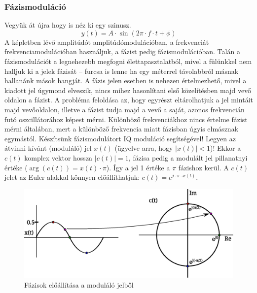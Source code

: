 \documentclass[12pt,a4paper]{article}
\begin{document}
\subsubsection{Fázismoduláció}

Vegyük át újra hogy is néz ki egy szinusz.
\begin{equation}
y(t) = A \cdot \sin{ ( 2\pi \cdot f \cdot t + \phi ) }
\end{equation}
A képletben lévő amplitúdót amplitúdómodulációban, a frekvenciát frekvenciamodulációban használjuk, a fázist pedig fázismodulációban. Talán a fázismodulációt a legnehezebb megfogni élettapasztalatból, mivel a fülünkkel nem halljuk ki a jelek fázisát -- furcsa is lenne ha egy méterrel távolabbról másnak hallanánk mások hangját. A fázis jelen esetben is nehezen értelmezhető, mivel a kiadott jel úgymond elveszik, nincs mihez hasonlítani első közelítésben majd vevő oldalon a fázist. A probléma feloldása az, hogy egyrészt eltárolhatjuk a jel mintáit majd vevőoldalon, illetve a fázist tudja majd a vevő a saját, azonos frekvencián futó oszcillátorához képest mérni. Különböző frekvenciákhoz nincs értelme fázist mérni általában, mert a különböző frekvencia miatt fázisban úgyis elmásznak egymástól.
\clearpage
Készítsünk fázismodulátort IQ moduláció segítségével! Legyen az átvinni kívánt (moduláló) jel $x(t)$ (ügyelve arra, hogy $\vert x(t) \vert<1$)! Ekkor a $c(t)$ komplex vektor hossza $\vert c(t) \vert = 1$, fázisa pedig a modulált jel pillanatnyi értéke ($\arg\left(c(t)\right)=x(t) \cdot \pi$). Így a jel 1 értéke a $\pi$ fázishoz kerül. A $c(t)$ jelet az Euler alakkal könnyen előállíthatjuk: $c(t)=e^{j \cdot \pi \cdot x(t)}$.

\begin{figure}[H]
\begin{center}
\includegraphics[width=13cm]{figures/modulaciok_workshop_pm.eps}
\caption{Fázisok előállítása a moduláló jelből}
\label{fig:pm}
\end{center}
\end{figure}
\end{document}
